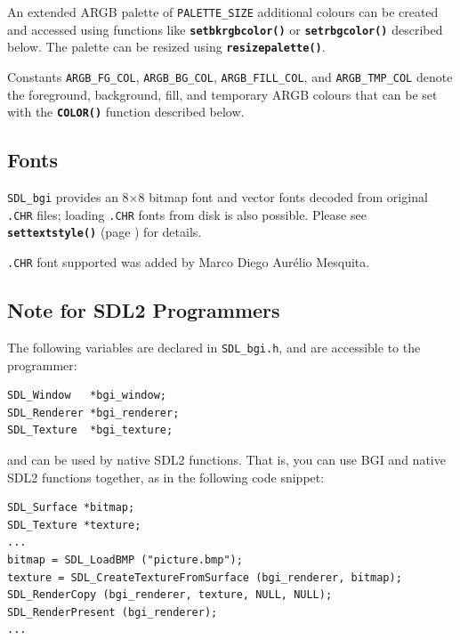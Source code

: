 \documentclass[a4paper,12pt]{article}
\newcommand{\SDLbgi}{\texttt{SDL\_bgi}}
\newcommand{\func}[1]{\textbf{\texttt{#1}}}  %
\newcommand{\F}[1]{\texttt{#1}}     %
\newcommand{\T}[1]{\texttt{#1}}     %
\begin{document}
An extended ARGB palette of \T{PALETTE\_SIZE} additional colours can
be created and accessed using functions like \func{setbkrgbco\-lor()}
or \func{setrbgcolor()} described below. The palette can be resized
using \func{resizepalette()}.

Constants \T{ARGB\_FG\_COL}, \T{ARGB\_BG\_COL}, \T{ARGB\_FILL\_COL},
and \T{ARGB\_TMP\_COL} denote the foreground, background, fill, and
temporary ARGB colours that can be set with the \func{COLOR()}
function described below.


\subsection{Fonts}

\SDLbgi{} provides an 8$\times$8 bitmap font and vector fonts decoded
from original \T{.CHR} files; loading \T{.CHR} fonts from disk is also
possible. Please see \func{settextstyle()} (page
\pageref{sec:settextstyle}) for details.

  \T{.CHR} font supported was added by Marco Diego Aur\'elio Mesquita.



\subsection{Note for SDL2 Programmers}

The following variables are declared in \F{SDL\_bgi.h}, and are
accessible to the programmer:

\begin{small}
\begin{spacing}{0.85}
\begin{verbatim}
SDL_Window   *bgi_window;
SDL_Renderer *bgi_renderer;
SDL_Texture  *bgi_texture;
\end{verbatim}
\end{spacing}
\end{small}

and can be used by native SDL2 functions. That is, you can use BGI and
native SDL2 functions together, as in the following code snippet:

\begin{small}
\begin{spacing}{0.85}
\begin{verbatim}
SDL_Surface *bitmap;
SDL_Texture *texture;
...
bitmap = SDL_LoadBMP ("picture.bmp");
texture = SDL_CreateTextureFromSurface (bgi_renderer, bitmap);
SDL_RenderCopy (bgi_renderer, texture, NULL, NULL);
SDL_RenderPresent (bgi_renderer);
...
\end{verbatim}
\end{spacing}
\end{small}
\end{document}
